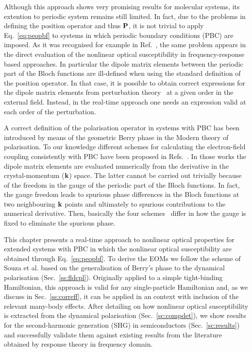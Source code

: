 Although this approach shows very promising results for molecular systems, its extention to periodic system remains still limited.
In fact, due to the problems in defining the position operator and thus ${\bf P}$, it is not trivial to apply Eq.~\eqref{eq:peopbf} to systems in which periodic boundary conditions (PBC) are imposed. As it was recognised for example in Ref.~\cite{PhysRevB.52.14636}, the same problem appears in the direct evaluation of the nonlinear optical susceptibility in frequency-response based approaches. In particular the dipole matrix elements between the periodic part of the Bloch functions are ill-defined when using the standard definition of the  position operator. In that case, it is possible to obtain correct expressions for the dipole matrix elements from perturbation theory~\cite{PhysRevB.52.14636,PhysRevB.48.11705,PhysRevB.82.235201,korbel2015optical} at a given order in the external field. Instead, in the real-time approach one needs an expression valid at each order of the perturbation.

A correct definition of the polarisation operator in systems with PBC has been introduced by means of the geometric Berry phase in the Modern theory of polarisation.\cite{RevModPhys.66.899} 
To our knowledge different schemes for calculating the electron-field coupling consistently with PBC have been proposed in Refs.~\cite{springborg, PhysRevB.76.035213, souza_prb, korbel2015optical}. In those works the dipole matrix elements are evaluated numerically from the derivative in the crystal-momentum (${\bf k}$) space. The latter cannot be carried out trivially because of the freedom in the gauge of the periodic part of the Bloch functions. In fact, the gauge freedom leads to spurious phase differences in the Bloch functions at two neighbouring ${\bf k}$ points and ultimately to spurious contributions to the numerical derivative.
Then, basically the four schemes~\cite{springborg, PhysRevB.76.035213, souza_prb, korbel2015optical} differ in how the gauge is fixed to eliminate the spurious phase.

This chapter presents a real-time \ai approach to nonlinear optical properties for extended systems with PBC in which the nonlinear optical susceptibility are obtained through Eq.~\eqref{eq:peopbf}. To derive the EOMs we follow the scheme of Souza et al.\cite{souza_prb} based on the generalisation of Berry's phase to the dynamical polarisation (Sec.~\ref{ss:fldcpl}). Originally applied to a simple tight-binding Hamiltonian, this approach is valid for any single-particle Hamiltonian and, as we discuss in Sec.~\ref{ss:correff}, it can be applied in an \ai context with inclusion of the relevant many-body effects. After detailing on how nonlinear optical susceptibility is extracted from the dynamical polarisation (Sec.~\ref{sc:compdet}), we show results for the second-harmonic generation (SHG) in semiconductors (Sec.~\ref{sc:results}) and successfully validate them against existing results from the literature obtained by response theory in frequency domain.   
   
